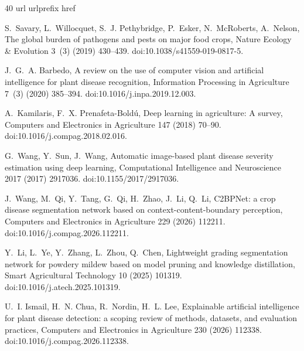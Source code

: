 \documentclass[5p,times]{elsarticle}
\begin{document}
\begin{thebibliography}{40}
\expandafter\ifx\csname url\endcsname\relax
  \def\url#1{\texttt{#1}}\fi
\expandafter\ifx\csname urlprefix\endcsname\relax\def\urlprefix{URL }\fi
\expandafter\ifx\csname href\endcsname\relax
  \def\href#1#2{#2} \def\path#1{#1}\fi

S.~Savary, L.~Willocquet, S.~J. Pethybridge, P.~Esker, N.~McRoberts, A.~Nelson,
  The global burden of pathogens and pests on major food crops, Nature Ecology
  \& Evolution 3~(3) (2019) 430--439. \href{https://doi.org/10.1038/s41559-019-0817-5}{doi:10.1038/s41559-019-0817-5}.

J.~G.~A. Barbedo, A review on the use of computer vision and artificial
  intelligence for plant disease recognition, Information Processing in
  Agriculture 7~(3) (2020) 385--394. \href{https://doi.org/10.1016/j.inpa.2019.12.003}{doi:10.1016/j.inpa.2019.12.003}.

A.~Kamilaris, F.~X. Prenafeta-Bold{\'u}, Deep learning in agriculture: A survey,
  Computers and Electronics in Agriculture 147 (2018) 70--90. \href{https://doi.org/10.1016/j.compag.2018.02.016}{doi:10.1016/j.compag.2018.02.016}.

G.~Wang, Y.~Sun, J.~Wang, Automatic image-based plant disease severity estimation
  using deep learning, Computational Intelligence and Neuroscience 2017 (2017)
  2917036. \href{https://doi.org/10.1155/2017/2917036}{doi:10.1155/2017/2917036}.

J.~Wang, M.~Qi, Y.~Tang, G.~Qi, H.~Zhao, J.~Li, Q.~Li, C2BPNet: a crop disease
  segmentation network based on context-content-boundary perception, Computers
  and Electronics in Agriculture 229 (2026) 112211. \href{https://doi.org/10.1016/j.compag.2026.112211}{doi:10.1016/j.compag.2026.112211}.

Y.~Li, L.~Ye, Y.~Zhang, L.~Zhou, Q.~Chen, Lightweight grading segmentation
  network for powdery mildew based on model pruning and knowledge distillation,
  Smart Agricultural Technology 10 (2025) 101319. \href{https://doi.org/10.1016/j.atech.2025.101319}{doi:10.1016/j.atech.2025.101319}.

U.~I. Ismail, H.~N. Chua, R.~Nordin, H.~L. Lee, Explainable artificial
  intelligence for plant disease detection: a scoping review of methods,
  datasets, and evaluation practices, Computers and Electronics in Agriculture
  230 (2026) 112338. \href{https://doi.org/10.1016/j.compag.2026.112338}{doi:10.1016/j.compag.2026.112338}.


\end{thebibliography}
\end{document}
